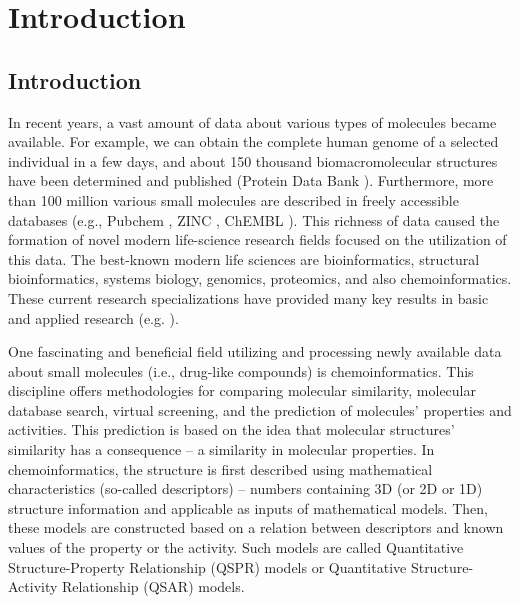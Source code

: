 \part{Introduction}

\chapter{Introduction}

In recent years, a vast amount of data about various types of molecules became
available. For example, we can obtain the complete human genome of a selected
individual in a few days, and about 150 thousand biomacromolecular structures
have been determined and published (Protein Data Bank \cite{Berman2014}).
Furthermore, more
than 100 million various small molecules are described in freely accessible
databases (e.g., Pubchem \cite{pubchem}, ZINC \cite{Irwin2012},
ChEMBL \cite{Bento2013}). This richness of data caused
the formation of novel modern life-science research fields focused on the
utilization of this data. The best-known modern life sciences are
bioinformatics, structural bioinformatics, systems biology, genomics,
proteomics, and also chemoinformatics. These current research specializations
have provided many key results in basic and applied research (e.g.
\cite{Paulsen2015, Cao2013, Prota2013, Lu2005, Puente2011, Nayal2006, Xie2009}
).

One fascinating and beneficial field utilizing and processing newly available
data about small molecules (i.e., drug-like compounds) is chemoinformatics.
This discipline offers me\-tho\-do\-lo\-gies for comparing molecular similarity,
molecular database search, virtual screening, and the prediction of molecules'
properties and activities. This prediction is based on the idea that molecular
structures' similarity has a consequence -- a similarity in molecular
properties. In chemoinformatics, the structure is first described using
mathematical characteristics (so-called descriptors) -- numbers containing 3D
(or 2D or 1D) structure information and applicable as inputs of mathematical
models. Then, these models are constructed based on a relation between
descriptors and known values of the property or the activity. Such models are
called Quantitative Stru\-cture-Property Relationship (QSPR) models or
Quantitative Structure-Activity Relationship (QSAR) models.

